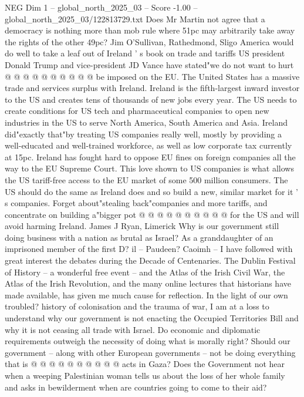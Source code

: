 \begin{textsample}{NEG Dim 1 – global\_north\_2025\_03 – Score -1.00 – global\_north\_2025\_03/122813729.txt}
Does Mr Martin not agree that a democracy is nothing more than mob rule where 51pc may arbitrarily take away the rights of the other 49pc?
Jim O'Sullivan, Rathedmond, Sligo America would do well to take a leaf out of Ireland ' s book on trade and tariffs US president Donald Trump and vice-president JD Vance have stated"we do not want to hurt @ @ @ @ @ @ @ @ @ @ be imposed on the EU.
The United States has a massive trade and services surplus with Ireland.
Ireland is the fifth-largest inward investor to the US and creates tens of thousands of new jobs every year.
The US needs to create conditions for US tech and pharmaceutical companies to open new industries in the US to serve North America, South America and Asia.
Ireland did"exactly that"by treating US companies really well, mostly by providing a well-educated and well-trained workforce, as well as low corporate tax currently at 15pc.
Ireland has fought hard to oppose EU fines on foreign companies all the way to the EU Supreme Court.
This love shown to US companies is what allows the US tariff-free access to the EU market of some 500 million consumers.
The US should do the same as Ireland does and so build a new, similar market for it ' s companies.
Forget about"stealing back"companies and more tariffs, and concentrate on building a"bigger pot @ @ @ @ @ @ @ @ @ @ for the US and will avoid harming Ireland.
James J Ryan, Limerick Why is our government still doing business with a nation as brutal as Israel?
As a granddaughter of an imprisoned member of the first D? il -- Paudeen?
Caoimh -- I have followed with great interest the debates during the Decade of Centenaries.
The Dublin Festival of History -- a wonderful free event -- and the Atlas of the Irish Civil War, the Atlas of the Irish Revolution, and the many online lectures that historians have made available, has given me much cause for reflection.
In the light of our own troubled? history of colonisation and the trauma of war, I am at a loss to understand why our government is not enacting the Occupied Territories Bill and why it is not ceasing all trade with Israel.
Do economic and diplomatic requirements outweigh the necessity of doing what is morally right?
Should our government -- along with other European governments -- not be doing everything that is @ @ @ @ @ @ @ @ @ @ acts in Gaza?
Does the Government not hear when a weeping Palestinian woman tells us about the loss of her whole family and asks in bewilderment when are countries going to come to their aid?

\end{textsample}
